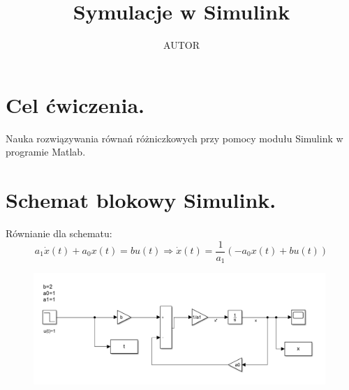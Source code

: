 \documentclass{article}
\title{Symulacje w Simulink}
\author{AUTOR}
\date{}
\begin{document}
\maketitle
\section{Cel ćwiczenia.}
Nauka rozwiązywania równań różniczkowych przy pomocy modułu Simulink w programie Matlab.  
\section{Schemat blokowy Simulink.}
Równianie dla schematu:
$$
a_1\dot{x}(t)+a_0x(t)=bu(t) \Rightarrow \dot{x}(t)=\frac{1}{a_1}( -a_0x(t)+bu(t))
$$
\begin{figure}[h!]
    \centering
    \includegraphics[width=0.985\textwidth]{POPRAWAuklad2.png}
    \label{fig:my_label}
\end{figure}


\newpage
\end{document}
